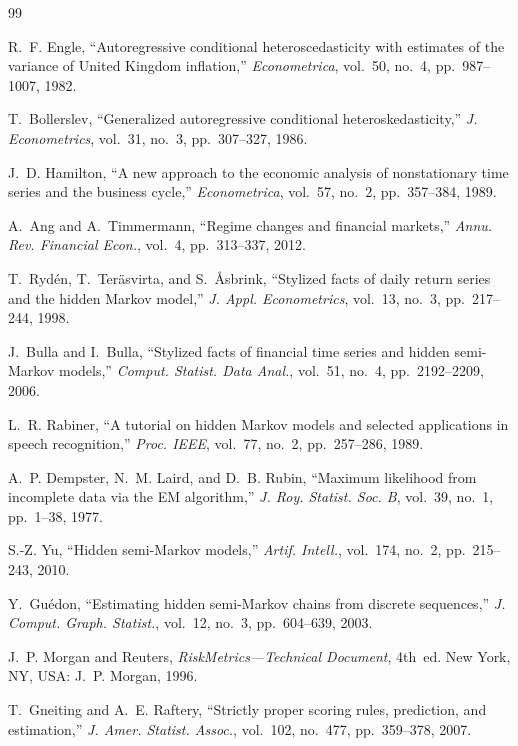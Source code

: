 \documentclass[conference]{IEEEtran}
\begin{document}
\begin{thebibliography}{99}
\footnotesize

R.~F. Engle, ``Autoregressive conditional heteroscedasticity with estimates of the variance of United Kingdom inflation,'' \emph{Econometrica}, vol.~50, no.~4, pp.~987--1007, 1982.

T.~Bollerslev, ``Generalized autoregressive conditional heteroskedasticity,'' \emph{J. Econometrics}, vol.~31, no.~3, pp.~307--327, 1986.

J.~D. Hamilton, ``A new approach to the economic analysis of nonstationary time series and the business cycle,'' \emph{Econometrica}, vol.~57, no.~2, pp.~357--384, 1989.

A.~Ang and A.~Timmermann, ``Regime changes and financial markets,'' \emph{Annu. Rev. Financial Econ.}, vol.~4, pp.~313--337, 2012.

T.~Ryd\'en, T.~Ter\"asvirta, and S.~\AA{}sbrink, ``Stylized facts of daily return series and the hidden Markov model,'' \emph{J. Appl. Econometrics}, vol.~13, no.~3, pp.~217--244, 1998.

J.~Bulla and I.~Bulla, ``Stylized facts of financial time series and hidden semi-Markov models,'' \emph{Comput. Statist. Data Anal.}, vol.~51, no.~4, pp.~2192--2209, 2006.

L.~R. Rabiner, ``A tutorial on hidden Markov models and selected applications in speech recognition,'' \emph{Proc. IEEE}, vol.~77, no.~2, pp.~257--286, 1989.

A.~P. Dempster, N.~M. Laird, and D.~B. Rubin, ``Maximum likelihood from incomplete data via the EM algorithm,'' \emph{J. Roy. Statist. Soc. B}, vol.~39, no.~1, pp.~1--38, 1977.

S.-Z. Yu, ``Hidden semi-Markov models,'' \emph{Artif. Intell.}, vol.~174, no.~2, pp.~215--243, 2010.

Y.~Gu\'edon, ``Estimating hidden semi-Markov chains from discrete sequences,'' \emph{J. Comput. Graph. Statist.}, vol.~12, no.~3, pp.~604--639, 2003.

J.~P. Morgan and Reuters, \emph{RiskMetrics---Technical Document}, 4th~ed. New York, NY, USA: J.~P. Morgan, 1996.

T.~Gneiting and A.~E. Raftery, ``Strictly proper scoring rules, prediction, and estimation,'' \emph{J. Amer. Statist. Assoc.}, vol.~102, no.~477, pp.~359--378, 2007.


\end{thebibliography}
\end{document}
